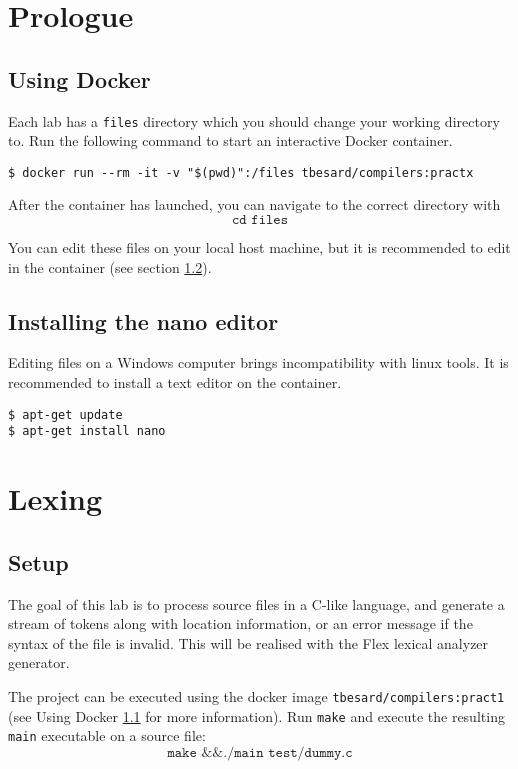 \documentclass{report}
\begin{document}
	\tableofcontents
	

	\chapter{Prologue}
	\section{Using Docker}
	\label{sec:using_docker}
	Each lab has a \texttt{files} directory which you should change your working directory to. Run the following command to start an interactive Docker container. 
	\begin{lstlisting}
$ docker run --rm -it -v "$(pwd)":/files tbesard/compilers:practx
	\end{lstlisting}
	After the container has launched, you can navigate to the correct directory with 
	$$\texttt{cd files}$$
	
	You can edit these files on your local host machine, but it is recommended to edit in the container (see section \ref{sec:install_nano}).
	\section{Installing the nano editor}
	\label{sec:install_nano}
	Editing files on a Windows computer brings incompatibility with linux tools. It is recommended to install a text editor on the container.
	\begin{lstlisting}
$ apt-get update
$ apt-get install nano
	\end{lstlisting}
	\chapter{Lexing}
	\section{Setup}
	The goal of this lab is to process source files in a C-like language, and generate a stream of tokens along with location information, or an error message if the syntax of the file is invalid. This will be realised with the Flex lexical analyzer generator.
	
	The project can be executed using the docker image \texttt{tbesard/compilers:pract1} (see Using Docker \ref{sec:using_docker} for more information). Run \texttt{make} and execute the resulting \texttt{main} executable on a source file:
	$$\texttt{make \&\& ./main test/dummy.c}$$ 
	
\end{document}
